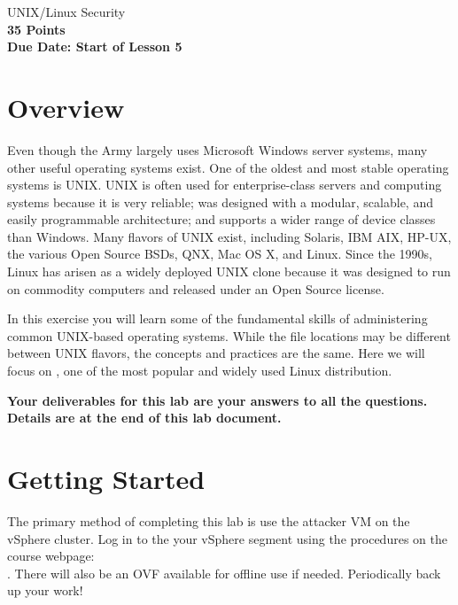 \documentclass{article}
\begin{document}
\begin{center}
{\LARGE UNIX/Linux Security}\\
\textbf{35 Points }\\
\textbf{Due Date: Start of Lesson 5}
\end{center}
\copyrightnoticeA



\setcounter{task}{1}
\newcommand{\tasks} {\bf {\noindent (\arabic{task})} \addtocounter{task}{1} \,}

\setcounter{Question}{1}
\newcommand{\question} {\textbf{Question {\noindent \arabic{Question}}:} \addtocounter{Question}{1} \,}

\section{Overview}

Even though the Army largely uses Microsoft Windows server systems, many other useful operating systems exist. One of the oldest and most stable operating systems is UNIX. UNIX is often used for enterprise-class servers and computing systems because it is very reliable; was designed with a modular, scalable, and easily programmable architecture; and supports a wider range of device classes than Windows. Many flavors of UNIX exist, including Solaris, IBM AIX, HP-UX, the various Open Source BSDs, QNX, Mac OS X, and Linux. Since the 1990s, Linux has arisen as a widely deployed UNIX clone because it was designed to run on commodity computers and released under an Open Source license.

In this exercise you will learn some of the fundamental skills of administering common UNIX-based operating systems. While the file locations may be different between UNIX flavors, the concepts and practices are the same. Here we will focus on \ubuntu, one of the most popular and widely used Linux distribution.



\textbf{Your deliverables for this lab are your answers to all the questions. %
Details are at the end of this lab document.}

\section{Getting Started}


The primary method of completing this lab is use the attacker VM on the vSphere cluster. Log in to the your vSphere segment using the procedures on the course webpage:\\
.
There will also be an OVF available for offline use if needed. Periodically back up your work!
\end{document}
